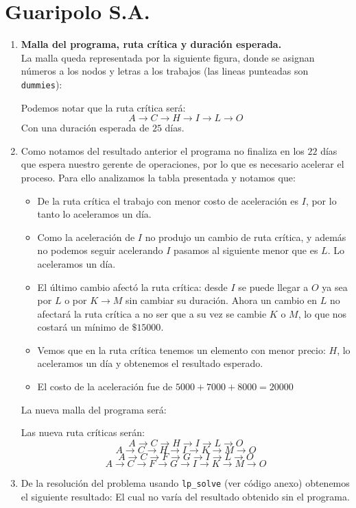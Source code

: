 \section{Guaripolo S.A.}
\begin{enumerate}
	\item \textbf{Malla del programa, ruta crítica y duración esperada.} \\
		La malla queda representada por la siguiente figura, donde se asignan
		números a los nodos y letras a los trabajos (las lineas punteadas son
		\texttt{dummies}):
		\begin{center}
			
		\end{center}
		Podemos notar que la ruta crítica será:
		$$ A\rightarrow C\rightarrow H\rightarrow I\rightarrow L\rightarrow O $$
		Con una duración esperada de $25$ días.
	\item
		Como notamos del resultado anterior el programa no finaliza en los $22$
		días que espera nuestro gerente de operaciones, por lo que es necesario
		acelerar el proceso. Para ello analizamos la tabla presentada y notamos 
		que:
		\begin{itemize}
			\item
				De la ruta crítica el trabajo con menor costo de aceleración es
				$I$, por lo tanto lo aceleramos un día.
			\item
				Como la aceleración de $I$ no produjo un cambio de ruta crítica,
				y además no podemos seguir acelerando $I$ pasamos al siguiente
				menor que es $L$. Lo aceleramos un día.
			\item
				El último cambio afectó la ruta crítica: desde $I$ se
				puede llegar a $O$ ya sea por $L$ o por $K\rightarrow M$ sin
				cambiar su duración. Ahora un cambio en $L$ no afectará la ruta
				crítica a no ser que a su vez se cambie $K$ o $M$, lo que nos
				costará un mínimo de $\$ 15000 $.
			\item
				Vemos que en la ruta crítica tenemos un elemento con menor
				precio: $H$, lo aceleramos un día y obtenemos el resultado
				esperado.
			\item
				El costo de la aceleración fue de $5000 + 7000 + 8000 = 20000$
		\end{itemize}
		La nueva malla del programa será:
		\begin{center}
			
		\end{center}
		Las nueva ruta críticas serán:
		$$ A\rightarrow C\rightarrow H\rightarrow I\rightarrow L\rightarrow O $$
		$$ A\rightarrow C\rightarrow H\rightarrow I\rightarrow K\rightarrow 
			M\rightarrow O $$
		$$ A\rightarrow C\rightarrow F\rightarrow G\rightarrow I\rightarrow 
			L\rightarrow O $$
		$$ A\rightarrow C\rightarrow F\rightarrow G\rightarrow I\rightarrow 
			K\rightarrow M\rightarrow O $$
	\item
		De la resolución del problema usando \texttt{lp\_solve} (ver código 
		anexo) obtenemos el siguiente resultado:
		El cual no varía del resultado obtenido sin el programa.
\end{enumerate}
